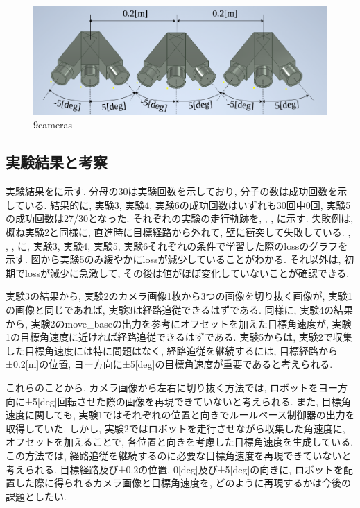 \begin{figure}[h]
  \centering
  \includegraphics[keepaspectratio, scale=0.35]{images/9cam_draw.png}
  \caption{9cameras}
  \label{Fig:9cam}
\end{figure}

\newpage
\subsection{実験結果と考察}
実験結果をに示す. 分母の30は実験回数を示しており, 分子の数は成功回数を示している. 結果的に, 実験3, 実験4, 実験6の成功回数はいずれも30回中0回, 実験5の成功回数は27/30となった. それぞれの実験の走行軌跡を, , , に示す. 失敗例は, 概ね実験2と同様に, 直進時に目標経路から外れて, 壁に衝突して失敗している. , , ,  に, 実験3, 実験4, 実験5, 実験6それぞれの条件で学習した際のlossのグラフを示す. 図から実験5のみ緩やかにlossが減少していることがわかる. それ以外は, 初期でlossが減少に急激して, その後は値がほぼ変化していないことが確認できる. 
\par 実験3の結果から, 実験2のカメラ画像1枚から3つの画像を切り抜く画像が, 実験1の画像と同じであれば, 実験3は経路追従できるはずである. 同様に, 実験4の結果から, 実験2のmove\_baseの出力を参考にオフセットを加えた目標角速度が, 実験1の目標角速度に近ければ経路追従できるはずである. 実験5からは, 実験2で収集した目標角速度には特に問題はなく, 経路追従を継続するには, 目標経路から±0.2[m]の位置, ヨー方向に±5[deg]の目標角速度が重要であると考えられる. 
\par これらのことから, カメラ画像から左右に切り抜く方法では, ロボットをヨー方向に±5[deg]回転させた際の画像を再現できていないと考えられる. また, 目標角速度に関しても, 実験1ではそれぞれの位置と向きでルールベース制御器の出力を取得していた. しかし, 実験2ではロボットを走行させながら収集した角速度に, オフセットを加えることで, 各位置と向きを考慮した目標角速度を生成している. この方法では, 経路追従を継続するのに必要な目標角速度を再現できていないと考えられる. 目標経路及び±0.2の位置, 0[deg]及び±5[deg]の向きに, ロボットを配置した際に得られるカメラ画像と目標角速度を, どのように再現するかは今後の課題としたい. 

